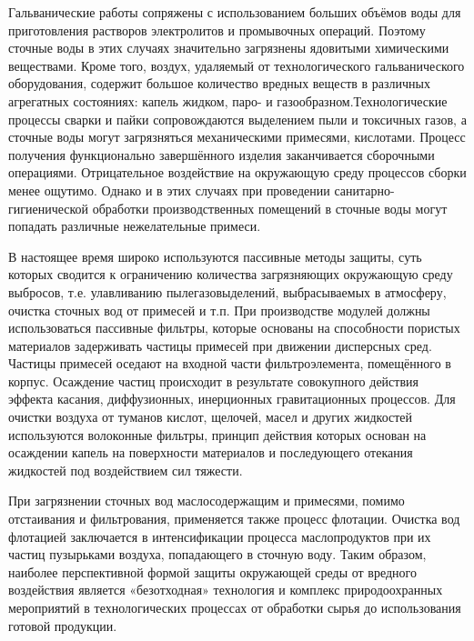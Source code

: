 Гальванические работы сопряжены с использованием больших объёмов воды для приготовления растворов электролитов и
промывочных операций. Поэтому сточные воды в этих случаях значительно загрязнены ядовитыми химическими веществами.
Кроме того, воздух, удаляемый от технологического гальванического оборудования, содержит большое количество вредных
веществ в различных агрегатных состояниях: капель жидком, паро- и газообразном.Технологические процессы сварки и
пайки сопровождаются выделением пыли и токсичных газов, а сточные воды могут загрязняться механическими примесями,
кислотами. Процесс получения функционально завершённого изделия заканчивается сборочными операциями. Отрицательное
воздействие на окружающую среду процессов сборки менее ощутимо. Однако и в этих случаях при проведении
санитарно-гигиенической обработки производственных помещений в сточные воды могут попадать различные нежелательные примеси.

В настоящее время широко используются пассивные методы защиты, суть которых сводится к ограничению количества
загрязняющих окружающую среду выбросов, т.е. улавливанию пылегазовыделений, выбрасываемых в атмосферу, очистка
сточных вод от примесей и т.п. При производстве модулей должны использоваться пассивные фильтры, которые основаны
на способности пористых материалов задерживать частицы примесей при движении дисперсных сред. Частицы примесей оседают
на входной части фильтроэлемента, помещённого в корпус. Осаждение частиц происходит в результате совокупного действия
эффекта касания, диффузионных, инерционных гравитационных процессов. Для очистки воздуха от туманов кислот, щелочей,
масел и других жидкостей используются волоконные фильтры, принцип действия которых основан на осаждении капель на
поверхности материалов и последующего отекания жидкостей под воздействием сил тяжести.

При загрязнении сточных вод маслосодержащим и примесями, помимо отстаивания и фильтрования, применяется также
процесс флотации. Очистка вод флотацией заключается в интенсификации процесса маслопродуктов при их частиц
пузырьками воздуха, попадающего в сточную воду. Таким образом, наиболее перспективной формой защиты окружающей
среды от вредного воздействия является «безотходная» технология и комплекс природоохранных мероприятий в
технологических процессах от обработки сырья до использования готовой продукции.

\newpage
